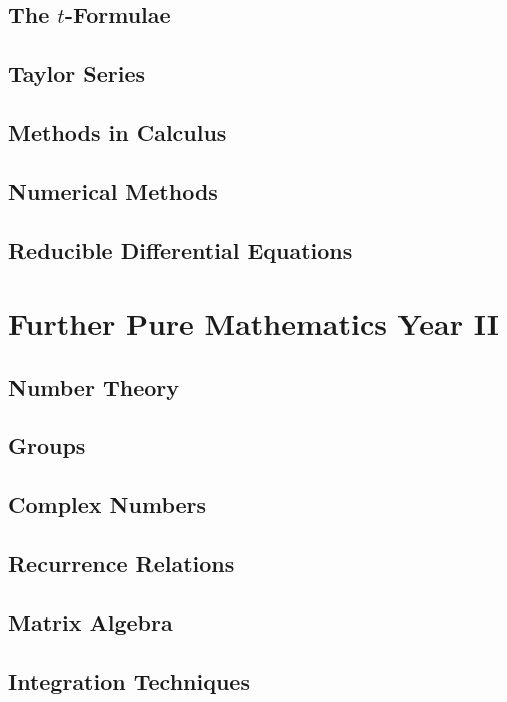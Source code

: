 \documentclass{book}
\begin{document}
    \section{The $t$-Formulae} \label{}
    \newpage
    \section{Taylor Series} \label{}
    \newpage
    \section{Methods in Calculus} \label{}
    \newpage
    \section{Numerical Methods} \label{}
    \newpage
    \section{Reducible Differential Equations} \label{}
    \newpage

\chapter{Further Pure Mathematics Year II} \label{ch:pure_ii}
    \section{Number Theory} \label{}
    \newpage
    \section{Groups} \label{}
    \newpage
    \section{Complex Numbers} \label{}
    \newpage
    \section{Recurrence Relations} \label{}
    \newpage
    \section{Matrix Algebra} \label{}
    \newpage
    \section{Integration Techniques} \label{}
    \newpage
\end{document}
